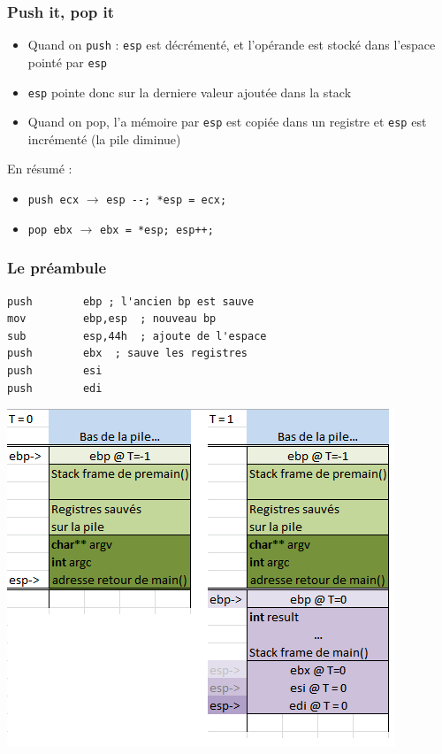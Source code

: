 \documentclass{beamer}
\begin{document}
\begin{frame}[fragile]
\frametitle{Push it, pop it}
\begin{itemize}
\item Quand on \texttt{push} : \texttt{esp} est décrémenté, et l'opérande est stocké dans l'espace pointé par \texttt{esp}
\item \texttt{esp} pointe donc sur la derniere valeur ajoutée dans la stack
\item Quand on pop, l'a mémoire par \texttt{esp} est copiée dans un registre et \texttt{esp} est incrémenté (la pile diminue)
\end{itemize}
\pause
En résumé :
\begin{itemize}
\item  \lstinline[language={[x86masm]Assembler}]+push ecx+ $\rightarrow$ \lstinline+esp --; *esp = ecx;+ 
\item  \lstinline[language={[x86masm]Assembler}]+pop ebx+ $\rightarrow$  \lstinline!ebx = *esp; esp++;!
\end{itemize}
\end{frame}



\begin{frame}[fragile]
\frametitle{Le préambule} 
\begin{lstlisting}[language={[x86masm]Assembler}, basicstyle={\scriptsize\ttfamily}]
push        ebp ; l'ancien bp est sauve
mov         ebp,esp  ; nouveau bp
sub         esp,44h  ; ajoute de l'espace
push        ebx  ; sauve les registres
push        esi  
push        edi  
\end{lstlisting}
\includegraphics[scale=0.5]{stack_01.png}
\end{frame}
\end{document}

